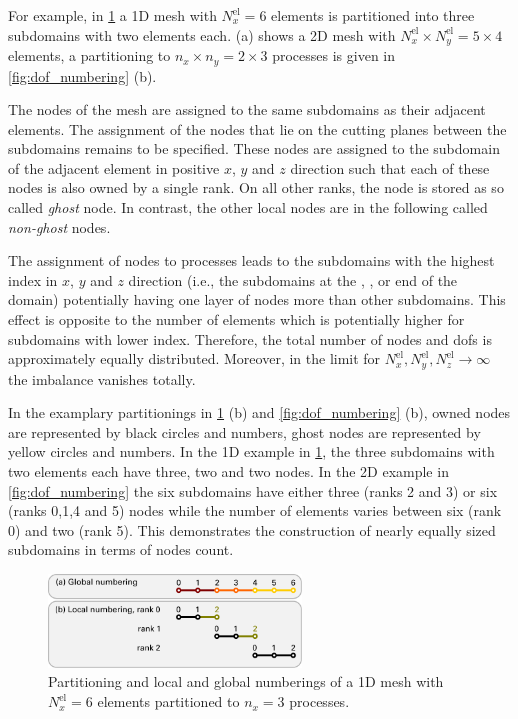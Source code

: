 For example, in \cref{fig:1d_nodes} a 1D mesh with $N^\text{el}_x=6$ elements is partitioned into three subdomains with two elements each. 
 (a) shows a 2D mesh with $N^\text{el}_x \times N^\text{el}_y = 5 \times 4$ elements, a partitioning to $n_x \times n_y = 2 \times 3$ processes is given in \cref{fig:dof_numbering} (b).

The nodes of the mesh are assigned to the same subdomains as their adjacent elements. 
The assignment of the nodes that lie on the cutting planes between the subdomains remains to be specified. These nodes are assigned to the subdomain of the adjacent element in positive $x$, $y$ and $z$ direction such that each of these nodes is also owned by a single rank. On all other ranks, the node is stored as so called \emph{ghost} node. In contrast, the other local nodes are in the following called \emph{non-ghost} nodes.

The assignment of nodes to processes leads to the subdomains with the highest index in $x$, $y$ and $z$ direction (i.e., the subdomains at the , , or  end of the domain) potentially having one layer of nodes more than other subdomains. This effect is opposite to the number of elements which is potentially higher for subdomains with lower index. Therefore, the total number of nodes and dofs is  approximately equally distributed. Moreover, in the limit for $N^\text{el}_x,N^\text{el}_y,N^\text{el}_z \to \infty$ the imbalance vanishes totally. 

In the examplary partitionings in \cref{fig:1d_nodes} (b) and \cref{fig:dof_numbering} (b), owned nodes are represented by black circles and numbers, ghost nodes are represented by yellow circles and numbers. In the 1D example in \cref{fig:1d_nodes}, the three subdomains with two elements each have three, two and two nodes. In the 2D example in \cref{fig:dof_numbering} the six subdomains have either three (ranks 2 and 3) or six (ranks 0,1,4 and 5) nodes while the number of elements varies between six (rank 0) and two (rank 5). This demonstrates the construction of nearly equally sized subdomains in terms of nodes count.

\begin{figure}%
  \centering%
  \includegraphics[width=0.6\textwidth]{images/implementation/1d_nodes.pdf}%
  \caption{Partitioning and local and global numberings of a 1D mesh with $N^\text{el}_x=6$ elements partitioned to $n_x=3$ processes.}%
  \label{fig:1d_nodes}%
\end{figure}%

